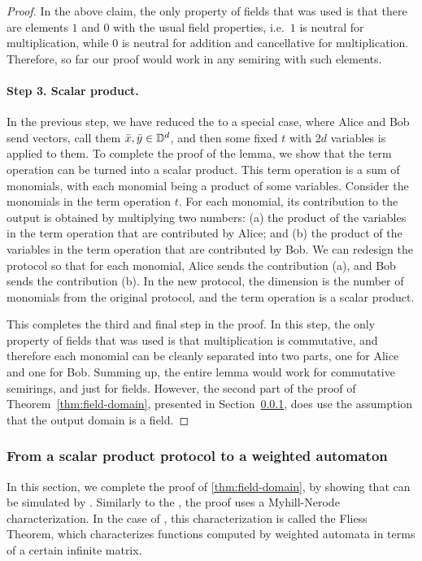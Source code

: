 \begin{proof}
 In the above claim, the only property of fields that was used is that there
 are elements $1$ and $0$ with the usual field properties, i.e.~$1$ is neutral
 for multiplication, while $0$ is neutral for addition and cancellative for
 multiplication. Therefore, so far our proof would work in any semiring with
 such elements.

 \paragraph*{Step 3. Scalar product.}
 In the previous step, we have reduced the  to a special case, where
 Alice and Bob send vectors, call them $\bar x, \bar y \in \mathbb D^d$, and then
 some fixed  $t$ with $2d$ variables is applied to them. To
 complete the proof of the lemma, we show that the term operation can be turned
 into a scalar product. This term operation is a sum of monomials, with each
 monomial being a product of some variables. Consider the monomials in the term
 operation $t$. For each monomial, its contribution to the output  is obtained
 by multiplying two numbers: (a) the product of the  variables in the term
 operation that are contributed by Alice; and   (b) the product of the
 variables in the term operation that are contributed by Bob. We can redesign
 the protocol so that for each monomial, Alice sends the contribution (a), and
 Bob sends the contribution (b). In the new protocol, the dimension is the
 number of monomials from the original protocol, and the term operation is a
 scalar product. 

  This completes the third and final step in the proof. In this step, the only
  property of fields that was used is that multiplication is commutative, and
  therefore each monomial can be cleanly separated into two parts, one for
  Alice and one for Bob. Summing up, the entire lemma would work for
  commutative semirings, and just for fields. However, the second part of the
  proof of Theorem~\ref{thm:field-domain}, presented in
  Section~\ref{sec:from-scalar-product-protocol-to-weighted-automaton}, does
  use the assumption  that the output domain is a field.
\end{proof}

\subsubsection{From a scalar product protocol to a weighted automaton}
\label{sec:from-scalar-product-protocol-to-weighted-automaton}
\AP
In this section, we complete the proof of \cref{thm:field-domain}, by showing
that  can be simulated by .
Similarly to the , the proof uses a
Myhill-Nerode characterization. In the case of , this
characterization is called  the Fliess Theorem, which characterizes
functions computed by weighted automata in terms of a certain infinite matrix.


